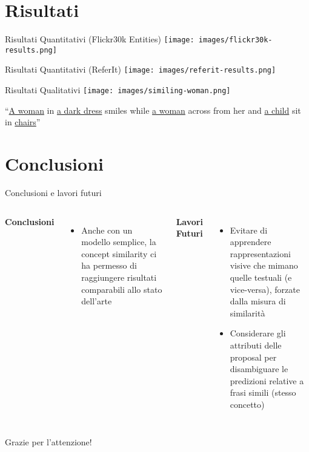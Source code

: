 \documentclass{beamer}
\begin{document}
\section{Risultati}

\begin{frame}{Risultati Quantitativi (Flickr30k Entities)}
  \centering
  \texttt{[image: images/flickr30k-results.png]}
\end{frame}

\begin{frame}{Risultati Quantitativi (ReferIt)}
  \centering
  \texttt{[image: images/referit-results.png]}
\end{frame}

\begin{frame}{Risultati Qualitativi}
  \centering
  \texttt{[image: images/similing-woman.png]}
  
  ``\underline{A woman} in \underline{a dark dress} smiles while
  \underline{a woman} across from her and \underline{a child} sit in
  \underline{chairs}''
\end{frame}

\section{Conclusioni}

\begin{frame}{Conclusioni e lavori futuri}
  \begin{columns}
      \textbf{Conclusioni}
      \begin{itemize}
        \item Anche con un \alert{modello semplice}, la concept
        similarity ci ha permesso di raggiungere \alert{risultati
        comparabili} allo stato dell'arte
      \end{itemize}
      \textbf{Lavori Futuri}
      \begin{itemize}
        \item \alert{Evitare} di apprendere \alert{rappresentazioni
        visive che mimano quelle testuali} (e vice-versa), forzate
        dalla misura di similarità
        \item Considerare gli \alert{attributi} delle proposal per
        \alert{disambiguare le predizioni} relative a frasi simili
        (stesso concetto)
      \end{itemize}
  \end{columns}
\end{frame}

\begin{frame}
  \centering
  \huge
  Grazie per l'attenzione!
\end{frame}
\end{document}
